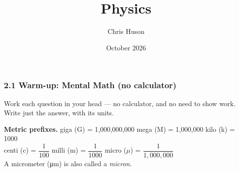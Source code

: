 \documentclass[12pt, twoside]{article}
\title{Physics}
\author{Chris Huson}
\date{October 2026}
\begin{document}
\subsubsection*{2.1 Warm-up: Mental Math (no calculator)}

Work each question in your head --- no calculator, and no need to show work. Write
just the answer, with its units.

\vspace{0.15cm}

\textbf{Metric prefixes.} \quad
giga (G) = 1{,}000{,}000{,}000 \quad mega (M) = 1{,}000{,}000 \quad kilo (k) = 1000 \\[0.1cm]
centi (c) = $\dfrac{1}{100}$ \quad milli (m) = $\dfrac{1}{1000}$
\quad micro ($\mu$) = $\dfrac{1}{1{,}000{,}000}$ \\[0.1cm]
A micrometer (\si{\micro\metre}) is also called a \emph{micron}.

\vspace{0.2cm}
\end{document}
